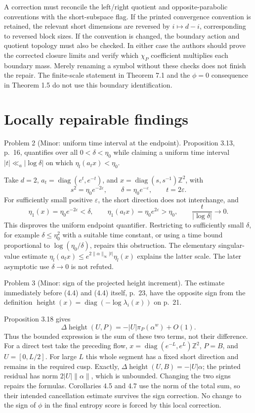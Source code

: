 \documentclass[10pt]{article}
\begin{document}
A correction must reconcile the left/right quotient and opposite-parabolic conventions with the short-subspace flag. If the printed convergence convention is retained, the relevant short dimensions are reversed by \(i\mapsto d-i\), corresponding to reversed block sizes. If the convention is changed, the boundary action and quotient topology must also be checked. In either case the authors should prove the corrected closure limits and verify which \(\chi_P\) coefficient multiplies each boundary mass. Merely renaming a symbol without these checks does not finish the repair. The finite-scale statement in Theorem 7.1 and the \(\phi=0\) consequence in Theorem 1.5 do not use this boundary identification.\par
\section*{Locally repairable findings}
Problem 2 (Minor: uniform time interval at the endpoint).  Proposition 3.13, p. 16, quantifies over all \(0<\delta<\eta_0\) while claiming a uniform time interval \(|t|\ll_a|\log\delta|\) on which \(\eta_l(a_t x)<\eta_0\).\par
Take \(d=2\), \(a_t=\operatorname{diag}(e^t,e^{-t})\), and \(x=\operatorname{diag}(s,s^{-1})\mathbb Z^2\), with \[s^2=\eta_0e^{-2\varepsilon},\qquad
 \delta=\eta_0e^{-\varepsilon},\qquad t=2\varepsilon.\] For sufficiently small positive \(\varepsilon\), the short direction does not interchange, and \[\eta_1(x)=\eta_0e^{-2\varepsilon}<\delta,\qquad
 \eta_1(a_t x)=\eta_0e^{2\varepsilon}>\eta_0,
 \qquad
 \frac{t}{|\log\delta|}\longrightarrow0.\] This disproves the uniform endpoint quantifier. Restricting to sufficiently small \(\delta\), for example \(\delta\le\eta_0^2\) with a suitable time constant, or using a time bound proportional to \(\log(\eta_0/\delta)\), repairs this obstruction. The elementary singular-value estimate \(\eta_l(a_t x)\le e^{2\|\alpha\|_\infty|t|}\eta_l(x)\) explains the latter scale. The later asymptotic use \(\delta\to0\) is not refuted.\par
Problem 3 (Minor: sign of the projected height increment).  The estimate immediately before (4.4) and (4.4) itself, p. 23, have the opposite sign from the definition \(\operatorname{height}(x)=\operatorname{diag}(-\log\lambda_i(x))\) on p. 21.\par
Proposition 3.18 gives \[\Delta\operatorname{height}(U,P)=-|U|\pi_P(\alpha^w)+O(1).\] Thus the bounded expression is the sum of these two terms, not their difference. For a direct test take the preceding flow, \(x=\operatorname{diag}(e^{-L},e^L)\mathbb Z^2\), \(P=B\), and \(U=[0,L/2]\). For large \(L\) this whole segment has a fixed short direction and remains in the required cusp. Exactly, \(\Delta\operatorname{height}(U,B)=-|U|\alpha\); the printed residual has norm \(2|U|\|\alpha\|\), which is unbounded. Changing the two signs repairs the formulas. Corollaries 4.5 and 4.7 use the norm of the total sum, so their intended cancellation estimate survives the sign correction. No change to the sign of \(\phi\) in the final entropy score is forced by this local correction.\par
\end{document}
